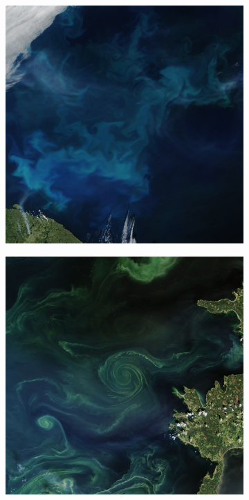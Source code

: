 \begin{figure} [H]
    \centering
    \begin{subfigure}[b]{.45\textwidth}
        \includegraphics[height=\textwidth]{img/barentseabloom_amo_2018201_lrg.jpg}
        \caption{}
        \label{fig:sat_barent}
    \end{subfigure}
    \begin{subfigure}[b]{.45\textwidth}
        \includegraphics[height=\textwidth]{img/gulfoffinland_oli_2018199_lrg.jpg}

\end{subfigure}
\end{figure}
